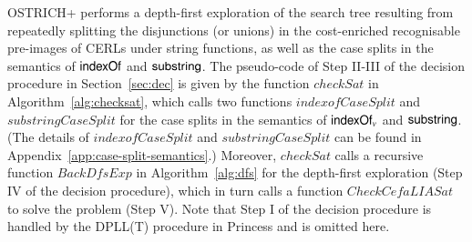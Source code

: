 OSTRICH+ performs a depth-first exploration of the search tree resulting from repeatedly
splitting the disjunctions (or unions) in the cost-enriched recognisable pre-images of CERLs under string functions, as well as the case splits in the semantics of $\mathsf{indexOf}$ and $\mathsf{substring}$.
The pseudo-code of Step II-III of the decision procedure in Section~\ref{sec:dec} is given by  the function $\mathit{checkSat}$ in Algorithm~\ref{alg:checksat}, which calls two functions $\mathit{indexofCaseSplit}$ and $\mathit{substringCaseSplit}$ for the case splits in the semantics of $\mathsf{indexOf}_v$ and $\mathsf{substring}$. (The details of $\mathit{indexofCaseSplit}$ and $\mathit{substringCaseSplit}$ can be found in Appendix~\ref{app:case-split-semantics}.) Moreover,  $\mathit{checkSat}$ calls a recursive function  $\mathit{BackDfsExp}$ in Algorithm~\ref{alg:dfs} for the depth-first exploration (Step IV of the decision procedure), which in turn calls a function $\mathit{CheckCefaLIASat}$ to solve the {\lasat} problem (Step V). Note that Step I of the decision procedure is handled by the DPLL(T) procedure in Princess and is omitted here. 






